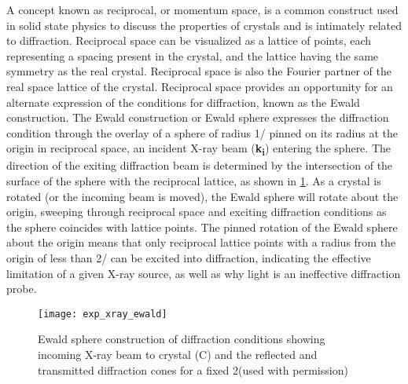 A concept known as reciprocal, or momentum space, is a common construct used in solid state physics to discuss the properties of crystals and is intimately related to diffraction.
Reciprocal space can be visualized as a lattice of points, each representing a spacing present in the crystal, and the lattice having the same symmetry as the real crystal.
Reciprocal space is also the Fourier partner of the real space lattice of the crystal.
Reciprocal space provides an opportunity for an alternate expression of the conditions for diffraction, known as the Ewald construction.
The Ewald construction or Ewald sphere expresses the diffraction condition through the overlay of a sphere of radius 1/\textlambda{} pinned on its radius at the origin in reciprocal space, an incident X-ray beam (\textbf{k\textsubscript{i}}) entering the sphere.
The direction of the exiting diffraction beam is determined by the intersection of the surface of the sphere with the reciprocal lattice, as shown in \cref{fig:exp_xray_ewald}.
As a crystal is rotated (or the incoming beam is moved), the Ewald sphere will rotate about the origin, sweeping through reciprocal space and exciting diffraction conditions as the sphere coincides with lattice points.
The pinned rotation of the Ewald sphere about the origin means that only reciprocal lattice points with a radius from the origin of less than 2/\textlambda{} can be excited into diffraction, indicating the effective limitation of a given X-ray source, as well as why light is an ineffective diffraction probe.
\begin{figure}
 \centering \texttt{[image: exp\_xray\_ewald]}
 \caption[Ewald sphere]{\label{fig:exp_xray_ewald}Ewald sphere construction of diffraction conditions showing incoming X-ray beam to crystal (C) and the reflected and transmitted diffraction cones for a fixed 2\straighttheta{}\cite{He2009}(used with permission)}
\end{figure}

